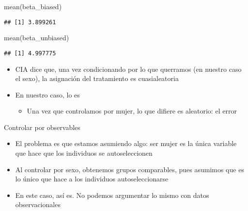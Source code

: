\documentclass[
  ignorenonframetext,
]{beamer}
\newenvironment{Shaded}{\begin{snugshade}}{\end{snugshade}}
\newcommand{\FunctionTok}[1]{\textcolor[rgb]{0.00,0.00,0.00}{#1}}
\newcommand{\NormalTok}[1]{#1}
\providecommand{\tightlist}{%
  \setlength{\itemsep}{0pt}\setlength{\parskip}{0pt}}
\begin{document}
\begin{frame}[fragile]{}
\protect\hypertarget{section-39}{}
\begin{Shaded}
\begin{Highlighting}[]
\FunctionTok{mean}\NormalTok{(beta\_biased)}
\end{Highlighting}
\end{Shaded}

\begin{verbatim}
## [1] 3.899261
\end{verbatim}

\begin{Shaded}
\begin{Highlighting}[]
\FunctionTok{mean}\NormalTok{(beta\_unbiased)}
\end{Highlighting}
\end{Shaded}

\begin{verbatim}
## [1] 4.997775
\end{verbatim}
\end{frame}

\begin{frame}{}
\protect\hypertarget{section-40}{}
\begin{itemize}
\tightlist
\item
  CIA dice que, una vez condicionando por lo que querramos (en nuestro
  caso el sexo), la asignación del tratamiento es cuasialeatoria
\item
  En nuestro caso, lo es

  \begin{itemize}
  \tightlist
  \item
    Una vez que controlamos por mujer, lo que difiere es aleatorio: el
    error
  \end{itemize}
\end{itemize}
\end{frame}

\begin{frame}{Controlar por observables}
\protect\hypertarget{controlar-por-observables}{}
\begin{itemize}
\tightlist
\item
  El problema es que estamos asumiendo algo: ser mujer es la única
  variable que hace que los individuos se autoseleccionen
\item
  Al controlar por sexo, obtenemos grupos comparables, pues asumimos que
  es lo único que hace a los individuos autoseleccionarse
\item
  En este caso, así es. No podemos argumentar lo mismo con datos
  observacionales
\end{itemize}
\end{frame}
\end{document}

